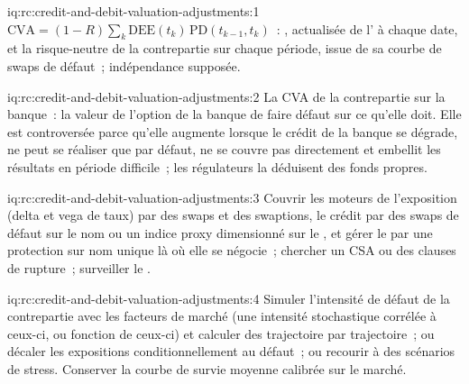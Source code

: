 \begin{solution}{iq:rc:credit-and-debit-valuation-adjustments:1}
$\mathrm{CVA} = (1-R)\sum_k\mathrm{DEE}(t_k)\,\mathrm{PD}(t_{k-1},t_k)$~: ,  actualisée
de l' à chaque date, et la  risque-neutre
de la contrepartie sur chaque période, issue de sa courbe de swaps de défaut~; indépendance supposée.
\end{solution}

\begin{solution}{iq:rc:credit-and-debit-valuation-adjustments:2}
La CVA de la contrepartie sur la banque~: la valeur de l'option de la banque de faire défaut sur ce qu'elle doit.
Elle est controversée parce qu'elle augmente lorsque le crédit de la banque se dégrade, ne peut se réaliser que par défaut,
ne se couvre pas directement et embellit les résultats en période difficile~; les régulateurs la déduisent des fonds propres.
\end{solution}

\begin{solution}{iq:rc:credit-and-debit-valuation-adjustments:3}
Couvrir les moteurs de l'exposition (delta et vega de taux) par des swaps et des swaptions, le crédit par
des swaps de défaut sur le nom ou un indice proxy dimensionné sur le , et gérer le  par
une protection sur nom unique là où elle se négocie~; chercher un CSA ou des clauses de rupture~; surveiller le .
\end{solution}

\begin{solution}{iq:rc:credit-and-debit-valuation-adjustments:4}
Simuler l'intensité de défaut de la contrepartie avec les facteurs de marché (une intensité stochastique corrélée
à ceux-ci, ou fonction de ceux-ci) et calculer des  trajectoire par trajectoire~; ou décaler
les expositions conditionnellement au défaut~; ou recourir à des scénarios de stress. Conserver la courbe de survie moyenne
calibrée sur le marché.
\end{solution}

